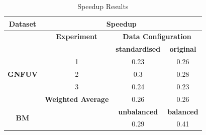 \documentclass{mpaper}
\begin{document}
\begin{table}[]
\centering
\begin{tabular}{|c|ccc|}
\hline
\textbf{Dataset}             & \multicolumn{3}{c|}{\textbf{Speedup}}                                                             \\ \hline
                             & \multicolumn{1}{c|}{\textbf{Experiment}}       & \multicolumn{2}{c|}{\textbf{Data Configuration}} \\ \cline{2-4} 
                             & \multicolumn{1}{l|}{}                          & \textbf{standardised}     & \textbf{original}    \\ \cline{2-4} 
                             & \multicolumn{1}{c|}{1}                         & 0.23                      & 0.26                 \\
\textbf{GNFUV}               & \multicolumn{1}{c|}{2}                         & 0.3                       & 0.28                 \\
                             & \multicolumn{1}{c|}{3}                         & 0.24                      & 0.23                 \\ \cline{2-4} 
                             & \multicolumn{1}{c|}{\textbf{Weighted Average}} & 0.26                      & 0.26                 \\ \hline
\multirow{2}{*}{\textbf{BM}} & \multicolumn{1}{l|}{}                          & \textbf{unbalanced}       & \textbf{balanced}    \\ \cline{3-4} 
                             & \multicolumn{1}{c|}{\textbf{}}                 & 0.29                      & 0.41                 \\ \hline
\end{tabular}
\caption{\label{tab:speedup}Speedup Results}
\end{table}
\end{document}
